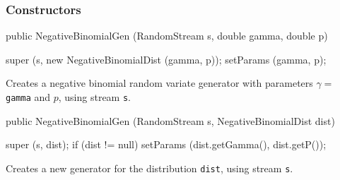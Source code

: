 \subsubsection* {Constructors}
\begin{code}

   public NegativeBinomialGen (RandomStream s, double gamma, double p) \begin{hide} {
      super (s, new NegativeBinomialDist (gamma, p));
      setParams (gamma, p);
   }\end{hide}
\end{code}
\begin{tabb} 
  Creates a negative binomial random variate generator with parameters
  $\gamma = $ \texttt{gamma} and $p$,  using stream \texttt{s}.
 \end{tabb}
\begin{code}

   public NegativeBinomialGen (RandomStream s, NegativeBinomialDist dist) \begin{hide} {
      super (s, dist);
      if (dist != null)
         setParams (dist.getGamma(), dist.getP());
   }\end{hide}
\end{code}
\begin{tabb} 
 Creates a new generator for the distribution \texttt{dist}, using 
  stream \texttt{s}.
 \end{tabb}


